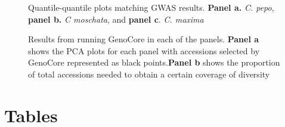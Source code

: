 \documentclass[utf8]{FrontiersinHarvard} %
\begin{document}
\begin{figure}[h]
	\caption{Quantile-quantile plots matching GWAS results. \textbf{Panel a.} \textit{C. pepo}, \textbf{panel b.} \textit{C moschata}, and \textbf{panel c}. \textit{C. maxima} \label{fig:9}}
\end{figure}


\begin{figure}[h]
	\caption{Results from running GenoCore in each of the panels. \textbf{Panel a} shows the PCA plots for each panel with accessions selected by GenoCore represented as black points.\textbf{Panel b} shows the proportion of total accessions needed to obtain a certain coverage of diversity \label{fig:10}}
\end{figure}





\newpage

\section*{Tables}
\end{document}
